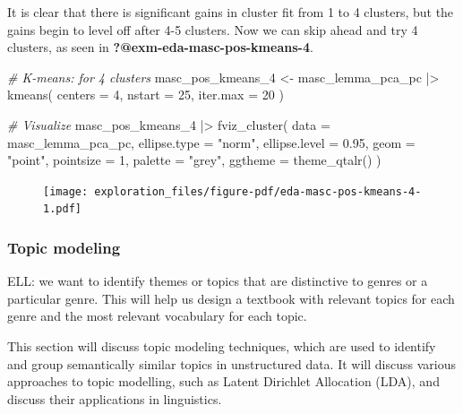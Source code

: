 \documentclass[
  letterpaper,
  DIV=11,
  numbers=noendperiod]{scrreport}
\newenvironment{Shaded}{\begin{snugshade}}{\end{snugshade}}
\newcommand{\AttributeTok}[1]{\textcolor[rgb]{0.00,0.00,0.00}{#1}}
\newcommand{\CommentTok}[1]{\textcolor[rgb]{0.00,0.00,0.00}{\textit{#1}}}
\newcommand{\DecValTok}[1]{\textcolor[rgb]{0.00,0.00,0.00}{#1}}
\newcommand{\FloatTok}[1]{\textcolor[rgb]{0.00,0.00,0.00}{#1}}
\newcommand{\FunctionTok}[1]{\textcolor[rgb]{0.00,0.00,0.00}{#1}}
\newcommand{\NormalTok}[1]{\textcolor[rgb]{0.00,0.00,0.00}{#1}}
\newcommand{\OtherTok}[1]{\textcolor[rgb]{0.00,0.00,0.00}{#1}}
\newcommand{\SpecialCharTok}[1]{\textcolor[rgb]{0.00,0.00,0.00}{#1}}
\newcommand{\StringTok}[1]{\textcolor[rgb]{0.00,0.00,0.00}{#1}}
\theoremstyle{definition}
\theoremstyle{remark}
\begin{document}
It is clear that there is significant gains in cluster fit from 1 to 4
clusters, but the gains begin to level off after 4-5 clusters. Now we
can skip ahead and try 4 clusters, as seen in
\textbf{?@exm-eda-masc-pos-kmeans-4}.

\begin{Shaded}
\begin{Highlighting}[]
\CommentTok{\# K{-}means: for 4 clusters}
\NormalTok{masc\_pos\_kmeans\_4 }\OtherTok{\textless{}{-}}
\NormalTok{  masc\_lemma\_pca\_pc }\SpecialCharTok{|\textgreater{}}
  \FunctionTok{kmeans}\NormalTok{(}
    \AttributeTok{centers =} \DecValTok{4}\NormalTok{,}
    \AttributeTok{nstart =} \DecValTok{25}\NormalTok{,}
    \AttributeTok{iter.max =} \DecValTok{20}
\NormalTok{  )}

\CommentTok{\# Visualize}
\NormalTok{masc\_pos\_kmeans\_4  }\SpecialCharTok{|\textgreater{}} 
  \FunctionTok{fviz\_cluster}\NormalTok{(}
  \AttributeTok{data =}\NormalTok{ masc\_lemma\_pca\_pc,}
  \AttributeTok{ellipse.type =} \StringTok{"norm"}\NormalTok{,}
  \AttributeTok{ellipse.level =} \FloatTok{0.95}\NormalTok{,}
  \AttributeTok{geom =} \StringTok{"point"}\NormalTok{,}
  \AttributeTok{pointsize =} \DecValTok{1}\NormalTok{,}
  \AttributeTok{palette =} \StringTok{"grey"}\NormalTok{,}
  \AttributeTok{ggtheme =} \FunctionTok{theme\_qtalr}\NormalTok{()}
\NormalTok{)}
\end{Highlighting}
\end{Shaded}

\begin{figure}[H]

{\centering \texttt{[image: exploration\_files/figure-pdf/eda-masc-pos-kmeans-4-1.pdf]}

}

\end{figure}

\hypertarget{sec-eda-topic-modeling}{%
\subsubsection{Topic modeling}\label{sec-eda-topic-modeling}}

ELL: we want to identify themes or topics that are distinctive to genres
or a particular genre. This will help us design a textbook with relevant
topics for each genre and the most relevant vocabulary for each topic.

This section will discuss topic modeling techniques, which are used to
identify and group semantically similar topics in unstructured data. It
will discuss various approaches to topic modelling, such as Latent
Dirichlet Allocation (LDA), and discuss their applications in
linguistics.
\end{document}
